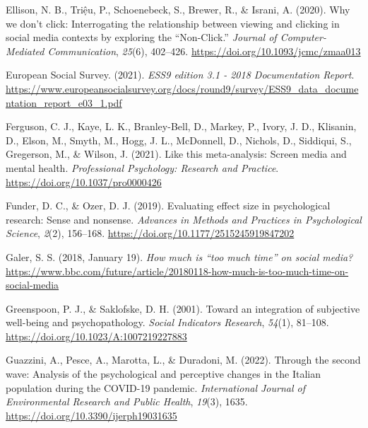 \documentclass[
  man,mask]{apa7}
\newlength{\cslhangindent}
\newlength{\cslentryspacingunit} %
\newenvironment{CSLReferences}[2] %
 {%
  \setlength{\parindent}{0pt}
  \ifodd #1
  \let\oldpar\par
  \def\par{\hangindent=\cslhangindent\oldpar}
  \fi
  \setlength{\parskip}{#2\cslentryspacingunit}
 }%
 {}
\begin{document}
\begin{CSLReferences}{1}{0}
\leavevmode{}%
Ellison, N. B., Triệu, P., Schoenebeck, S., Brewer, R., \& Israni, A. (2020). Why we don't click: {Interrogating} the relationship between viewing and clicking in social media contexts by exploring the {``{Non-Click}.''} \emph{Journal of Computer-Mediated Communication}, \emph{25}(6), 402--426. \url{https://doi.org/10.1093/jcmc/zmaa013}

\leavevmode{}%
European Social Survey. (2021). \emph{{ESS9} edition 3.1 - 2018 {Documentation Report}}. \url{https://www.europeansocialsurvey.org/docs/round9/survey/ESS9_data_documentation_report_e03_1.pdf}

\leavevmode{}%
Ferguson, C. J., Kaye, L. K., Branley-Bell, D., Markey, P., Ivory, J. D., Klisanin, D., Elson, M., Smyth, M., Hogg, J. L., McDonnell, D., Nichols, D., Siddiqui, S., Gregerson, M., \& Wilson, J. (2021). Like this meta-analysis: {Screen} media and mental health. \emph{Professional Psychology: Research and Practice}. \url{https://doi.org/10.1037/pro0000426}

\leavevmode{}%
Funder, D. C., \& Ozer, D. J. (2019). Evaluating effect size in psychological research: {Sense} and nonsense. \emph{Advances in Methods and Practices in Psychological Science}, \emph{2}(2), 156--168. \url{https://doi.org/10.1177/2515245919847202}

\leavevmode{}%
Galer, S. S. (2018, January 19). \emph{How much is {``too much time''} on social media?} \url{https://www.bbc.com/future/article/20180118-how-much-is-too-much-time-on-social-media}

\leavevmode{}%
Greenspoon, P. J., \& Saklofske, D. H. (2001). Toward an integration of subjective well-being and psychopathology. \emph{Social Indicators Research}, \emph{54}(1), 81--108. \url{https://doi.org/10.1023/A:1007219227883}

\leavevmode{}%
Guazzini, A., Pesce, A., Marotta, L., \& Duradoni, M. (2022). Through the second wave: {Analysis} of the psychological and perceptive changes in the {Italian} population during the {COVID-19} pandemic. \emph{International Journal of Environmental Research and Public Health}, \emph{19}(3), 1635. \url{https://doi.org/10.3390/ijerph19031635}


\end{CSLReferences}
\end{document}
